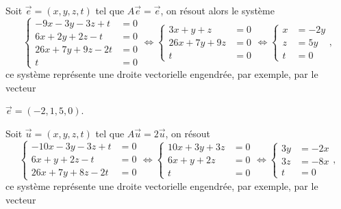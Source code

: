 {\begin{enumerate}
{Soit $\vec e=(x,y,z,t)$ tel que $A\vec e=\vec e$, on r\'esout alors le syst\`eme 
$$\left\{{\begin{align*}-9x-3y-3z+t&=0 \\ 6x+2y+2z-t&=0 \\ 26x+7y+9z-2t&=0 \\  t&=0\end{align*}}\right.\iff
\left\{{\begin{align*}3x+y+z&=0 \\ 26x+7y+9z&=0 \\  t&=0\end{align*}}\right.\iff
\left\{{\begin{align*}x&=-2y \\  z&=5y \\  t&=0\end{align*}}\right.,$$
ce syst\`eme repr\'esente une droite vectorielle engendr\'ee, par exemple, par le vecteur 

$\vec e=(-2,1,5,0)$.

Soit $\vec u=(x,y,z,t)$ tel que $A\vec u=2\vec u$, on r\'esout 
$$\left\{{\begin{align*}-10x-3y-3z+t&=0 \\ 6x+y+2z-t&=0 \\ 26x+7y+8z-2t&=0\end{align*}}\right.\iff
\left\{{\begin{align*}10x+3y+3z&=0 \\ 6x+y+2z&=0 \\  t&=0\end{align*}}\right.\iff
\left\{{\begin{align*}3y&=-2x \\  3z&=-8x \\  t&=0\end{align*}}\right.,$$
ce syst\`eme repr\'esente une droite vectorielle engendr\'ee, par exemple, par le vecteur

}
\end{enumerate}}

